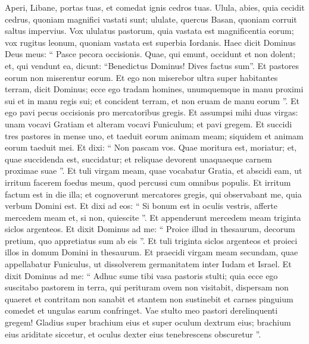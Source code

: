 \begin{biblechapter}
\begin{biblechapter}
\begin{biblechapter}
\begin{biblechapter}
\begin{biblechapter}
\begin{biblechapter}
\begin{biblechapter}
\begin{biblechapter}
\begin{biblechapter}
\begin{biblechapter}
\begin{biblechapter}
\verse Aperi, Libane, portas tuas,
 et comedat ignis cedros tuas.
 \verse Ulula, abies, quia cecidit cedrus,
 quoniam magnifici vastati sunt;
 ululate, quercus Basan,
 quoniam corruit saltus impervius.
 \verse Vox ululatus pastorum,
 quia vastata est magnificentia eorum;
 vox rugitus leonum,
 quoniam vastata est superbia Iordanis.
 \verse Haec dicit Dominus Deus meus: “ Pasce pecora occisionis. 
\verse Quae, qui emunt, occidunt et non dolent; et, qui vendunt ea, dicunt: “Benedictus Dominus! Dives factus sum”. Et pastores eorum non miserentur eorum.
 \verse Et ego non miserebor ultra super habitantes terram, dicit Dominus; ecce ego tradam homines, unumquemque in manu proximi sui et in manu regis sui; et concident terram, et non eruam de manu eorum ”.
 \verse Et ego pavi pecus occisionis pro mercatoribus gregis. Et assumpsi mihi duas virgas: unam vocavi Gratiam et alteram vocavi Funiculum; et pavi gregem. 
\verse Et succidi tres pastores in mense uno, et taeduit eorum animam meam; siquidem et animam eorum taeduit mei. 
\verse Et dixi: “ Non pascam vos. Quae moritura est, moriatur; et, quae succidenda est, succidatur; et reliquae devorent unaquaeque carnem proximae suae ”. 
\verse Et tuli virgam meam, quae vocabatur Gratia, et abscidi eam, ut irritum facerem foedus meum, quod percussi cum omnibus populis. 
\verse Et irritum factum est in die illa; et cognoverunt mercatores gregis, qui observabant me, quia verbum Domini est. 
\verse Et dixi ad eos: “ Si bonum est in oculis vestris, afferte mercedem meam et, si non, quiescite ”. Et appenderunt mercedem meam triginta siclos argenteos. 
\verse Et dixit Dominus ad me: “ Proice illud in thesaurum, decorum pretium, quo appretiatus sum ab eis ”.
 Et tuli triginta siclos argenteos et proieci illos in domum Domini in thesaurum. \verse Et praecidi virgam meam secundam, quae appellabatur Funiculus, ut dissolverem germanitatem inter Iudam et Israel.
 \verse Et dixit Dominus ad me:
 “ Adhuc sume tibi vasa pastoris stulti;
 \verse quia ecce ego suscitabo pastorem in terra,
 qui perituram ovem non visitabit,
 dispersam non quaeret
 et contritam non sanabit
 et stantem non sustinebit
 et carnes pinguium comedet
 et ungulas earum confringet.
 \verse Vae stulto meo pastori
 derelinquenti gregem!
 Gladius super brachium eius
 et super oculum dextrum eius;
 brachium eius ariditate siccetur,
 et oculus dexter eius tenebrescens obscuretur ”.
 

\end{biblechapter}
\end{biblechapter}
\end{biblechapter}
\end{biblechapter}
\end{biblechapter}
\end{biblechapter}
\end{biblechapter}
\end{biblechapter}
\end{biblechapter}
\end{biblechapter}
\end{biblechapter}

